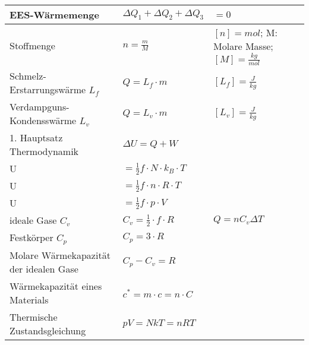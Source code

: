 \begin{tabularx}{\columnwidth}{@{}XXX@{}}
	EES-Wärmemenge                         & $\Delta Q_1 + \Delta Q_2 + \Delta Q_3$               & $= 0$                                                \\ \hline
	Stoffmenge                             & $n = \frac{m}{M}$                                    & $[n] = mol$; M: Molare Masse; $[M] = \frac{kg}{mol}$ \\ \hline
	Schmelz-Erstarrungswärme $L_f$         & $Q = L_f\cdot m$                                     & $[L_f] = \frac{J}{kg}$                               \\ \hline
	Verdampguns-Kondensswärme $L_v$        & $Q = L_v\cdot m$                                     & $[L_v] = \frac{J}{kg}$                               \\ \hline
	1. Hauptsatz Thermodynamik             & $\Delta U = Q + W$                                                                                          \\ \hline
	U                                      & $= \frac{1}{2}f\cdot N\cdot k_B \cdot T$                                                                    \\ \hline
	U                                      & $= \frac{1}{2}f\cdot n\cdot R \cdot T$                                                                      \\ \hline
	U                                      & $= \frac{1}{2}f\cdot p \cdot V$                                                                             \\ \hline
	ideale Gase $C_v$                      & $C_v = \frac{1}{2}\cdot f \cdot R$                   & $Q = nC_v\Delta T$                                   \\ \hline
	Festkörper $C_p$                       & $C_p = 3\cdot R$                                                                                            \\ \hline
	Molare Wärmekapazität der idealen Gase & $C_p - C_v = R$                                                                                             \\ \hline
	Wärmekapazität eines Materials         & $c^{*} = m \cdot c = n \cdot C$                                                                             \\ \hline
	Thermische Zustandsgleichung           & $pV = NkT = nRT$                                                                                            \\ \hline

\end{tabularx}
